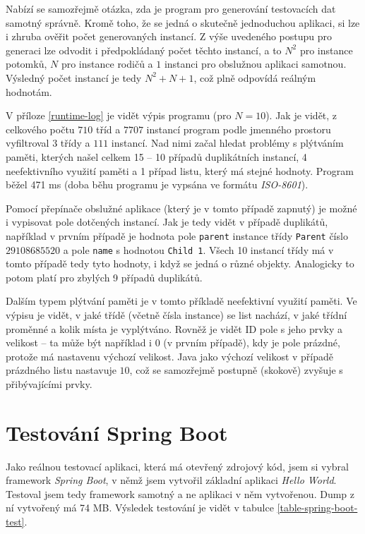 Nabízí se samozřejmě otázka, zda je program pro generování testovacích dat samotný správně. Kromě toho, že se jedná o skutečně jednoduchou aplikaci, si lze i zhruba ověřit počet generovaných instancí. Z výše uvedeného postupu pro generaci lze odvodit i předpokládaný počet těchto instancí, a to $N^2$ pro instance potomků, $N$ pro instance rodičů a $1$ instanci pro obslužnou aplikaci samotnou. Výsledný počet instancí je tedy $N^2 + N + 1$, což plně odpovídá reálným hodnotám.

V příloze \ref{runtime-log} je vidět výpis programu (pro $N=10$). Jak je vidět, z celkového počtu $710$ tříd a $7707$ instancí program podle jmenného prostoru vyfiltroval $3$ třídy a $111$ instancí. Nad nimi začal hledat problémy s plýtváním paměti, kterých našel celkem 15 -- 10 případů duplikátních instancí, 4 neefektivního využití paměti a 1 případ listu, který má stejné hodnoty. Program běžel 471 ms (doba běhu programu je vypsána ve formátu \textit{ISO-8601}).

Pomocí přepínače obslužné aplikace (který je v tomto případě zapnutý) je možné i vypisovat pole dotčených instancí. Jak je tedy vidět v případě duplikátů, například v prvním případě je hodnota pole \texttt{parent} instance třídy \texttt{Parent} číslo $29108685520$ a pole \texttt{name} s hodnotou \texttt{Child 1}. Všech 10 instancí třídy má v tomto případě tedy tyto hodnoty, i když se jedná o různé objekty. Analogicky to potom platí pro zbylých 9 případů duplikátů.

Dalším typem plýtvání paměti je v tomto příkladě neefektivní využití paměti. Ve výpisu je vidět, v jaké třídě (včetně čísla instance) se list nachází, v jaké třídní proměnné a kolik místa je vyplýtváno. Rovněž je vidět ID pole s jeho prvky a velikost -- ta může být například i $0$ (v prvním případě), kdy je pole prázdné, protože má nastavenu výchozí velikost. Java jako výchozí velikost v případě prázdného listu nastavuje $10$, což se samozřejmě postupně (skokově) zvyšuje s přibývajícími prvky.

\section{Testování Spring Boot}
Jako reálnou testovací aplikaci, která má otevřený zdrojový kód, jsem si vybral framework \textit{Spring Boot}, v němž jsem vytvořil základní aplikaci \textit{Hello World}. Testoval jsem tedy framework samotný a ne aplikaci v něm vytvořenou. Dump z ní vytvořený má 74 MB. Výsledek testování je vidět v tabulce \ref{table-spring-boot-test}. 

